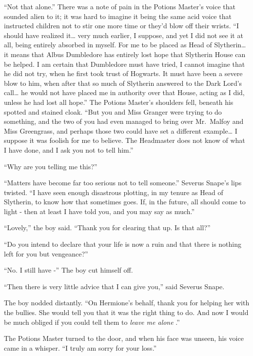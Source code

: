 ``Not that alone.'' There was a note of pain in the Potions Master's
voice that sounded alien to it; it was hard to imagine it being the same
acid voice that instructed children not to stir one more time or they'd
blow off their wrists. ``I should have realized it\ldots{} very much
earlier, I suppose, and yet I did not see it at all, being entirely
absorbed in myself. For me to be placed as Head of Slytherin\ldots{} it
means that Albus Dumbledore has entirely lost hope that Slytherin House
can be helped. I am certain that Dumbledore must have tried, I cannot
imagine that he did not try, when he first took trust of Hogwarts. It
must have been a severe blow to him, when after that so much of
Slytherin answered to the Dark Lord's call\ldots{} he would not have
placed me in authority over that House, acting as I did, unless he had
lost all hope.'' The Potions Master's shoulders fell, beneath his
spotted and stained cloak. ``But you and Miss Granger were trying to do
something, and the two of you had even managed to bring over Mr.~Malfoy
and Miss Greengrass, and perhaps those two could have set a different
example\ldots{} I suppose it was foolish for me to believe. The
Headmaster does not know of what I have done, and I ask you not to tell
him.''

``Why are you telling me this?''

``Matters have become far too serious not to tell someone.'' Severus
Snape's lips twisted. ``I have seen enough disastrous plotting, in my
tenure as Head of Slytherin, to know how that sometimes goes. If, in the
future, all should come to light - then at least I have told you, and
you may say as much.''

``Lovely,'' the boy said. ``Thank you for clearing that up. Is that
all?''

``Do you intend to declare that your life is now a ruin and that there
is nothing left for you but vengeance?''

``No. I still have -'' The boy cut himself off.

``Then there is very little advice that I can give you,'' said Severus
Snape.

The boy nodded distantly. ``On Hermione's behalf, thank you for helping
her with the bullies. She would tell you that it was the right thing to
do. And now I would be much obliged if you could tell them to
\emph{leave me alone} .''

The Potions Master turned to the door, and when his face was unseen, his
voice came in a whisper. ``I truly am sorry for your loss.''


